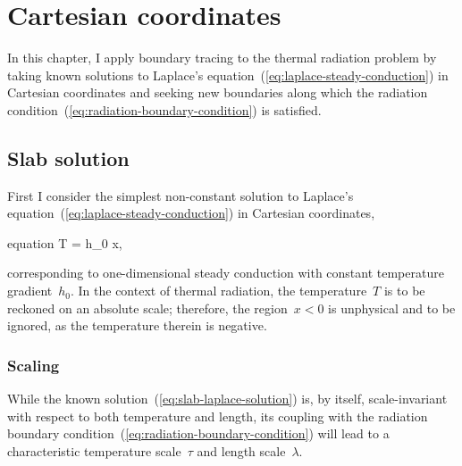 \chapter{Cartesian coordinates}
\label{ch:cartesian}

In this chapter,
I apply boundary tracing to the thermal radiation problem
by taking known solutions
to Laplace's equation~(\ref{eq:laplace-steady-conduction})
in Cartesian coordinates
and seeking new boundaries along which
the radiation condition~(\ref{eq:radiation-boundary-condition})
is satisfied.

\section{Slab solution}
\label{sec:cartesian.slab}

First I consider the simplest non-constant solution
to Laplace's equation~(\ref{eq:laplace-steady-conduction})
in Cartesian coordinates,
\begin{important}{equation}
  T = h_0 x,
  \label{eq:slab-laplace-solution}
\end{important}
corresponding to one-dimensional steady conduction
with constant temperature gradient~$h_0$.
In the context of thermal radiation,
the temperature~$T$ is to be reckoned on an absolute scale;
therefore, the region~$x < 0$ is unphysical and to be ignored,
as the temperature therein is negative.

\subsection{Scaling}
\label{sec:cartesian.slab.scaling}

While the known solution~(\ref{eq:slab-laplace-solution}) is, by itself,
scale-invariant with respect to both temperature and length,
its coupling with
the radiation boundary condition~(\ref{eq:radiation-boundary-condition})
will lead to a characteristic temperature scale~$\tau$
and length scale~$\lambda$.


